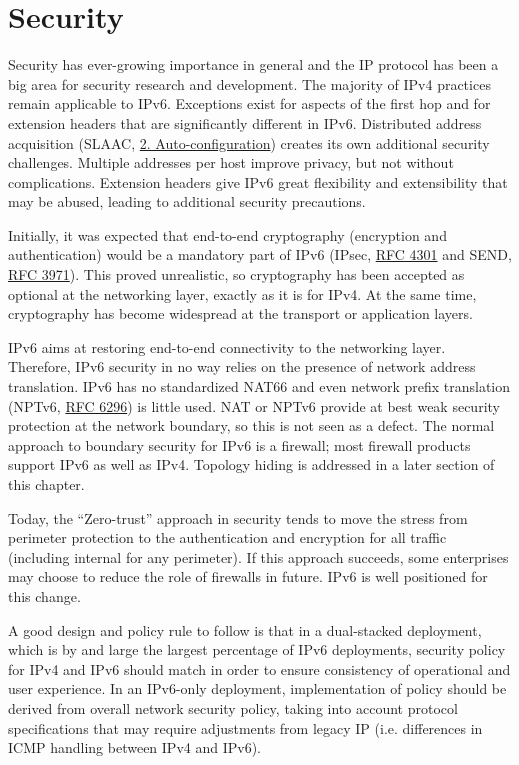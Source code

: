\documentclass[
]{article}
\begin{document}
\section{Security}\label{security}

Security has ever-growing importance in general and the IP protocol has
been a big area for security research and development. The majority of
IPv4 practices remain applicable to IPv6. Exceptions exist for aspects
of the first hop and for extension headers that are significantly
different in IPv6. Distributed address acquisition (SLAAC,
\hyperref[auto-configuration]{2. Auto-configuration}) creates its own
additional security challenges. Multiple addresses per host improve
privacy, but not without complications. Extension headers give IPv6
great flexibility and extensibility that may be abused, leading to
additional security precautions.

Initially, it was expected that end-to-end cryptography (encryption and
authentication) would be a mandatory part of IPv6 (IPsec,
\href{https://www.rfc-editor.org/info/rfc4301}{RFC 4301} and SEND,
\href{https://www.rfc-editor.org/info/rfc3971}{RFC 3971}). This proved
unrealistic, so cryptography has been accepted as optional at the
networking layer, exactly as it is for IPv4. At the same time,
cryptography has become widespread at the transport or application
layers.

IPv6 aims at restoring end-to-end connectivity to the networking layer.
Therefore, IPv6 security in no way relies on the presence of network
address translation. IPv6 has no standardized NAT66 and even network
prefix translation (NPTv6,
\href{https://www.rfc-editor.org/info/rfc6296}{RFC 6296}) is little
used. NAT or NPTv6 provide at best weak security protection at the
network boundary, so this is not seen as a defect. The normal approach
to boundary security for IPv6 is a firewall; most firewall products
support IPv6 as well as IPv4. Topology hiding is addressed in a later
section of this chapter.

Today, the ``Zero-trust'' approach in security tends to move the stress
from perimeter protection to the authentication and encryption for all
traffic (including internal for any perimeter). If this approach
succeeds, some enterprises may choose to reduce the role of firewalls in
future. IPv6 is well positioned for this change.

A good design and policy rule to follow is that in a dual-stacked
deployment, which is by and large the largest percentage of IPv6
deployments, security policy for IPv4 and IPv6 should match in order to
ensure consistency of operational and user experience. In an IPv6-only
deployment, implementation of policy should be derived from overall
network security policy, taking into account protocol specifications
that may require adjustments from legacy IP (i.e. differences in ICMP
handling between IPv4 and IPv6).
\end{document}
